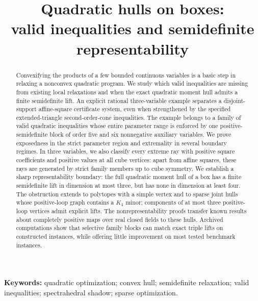 \documentclass[11pt]{article}
\title{Quadratic hulls on boxes:\\valid inequalities and semidefinite representability}
\author{}
\date{}
\begin{document}
\maketitle
\begin{abstract}
Convexifying the products of a few bounded continuous variables is a basic
step in relaxing a nonconvex quadratic program. We study which valid
inequalities are missing from existing local relaxations and when the exact
quadratic moment hull admits a finite semidefinite lift. An explicit rational
three-variable example separates a disjoint-support affine-square
certificate system, even when strengthened by the specified extended-triangle
second-order-cone inequalities. The example belongs to a family of valid
quadratic inequalities whose entire parameter range is enforced by one
positive-semidefinite block of order five and six nonnegative auxiliary
variables. We prove exposedness in the strict parameter region and extremality
in several boundary regimes. In three variables, we also classify every extreme
ray with positive square coefficients and positive values at all cube vertices:
apart from affine squares, these rays are generated by strict family members
up to cube symmetry. We establish a sharp
representability boundary: the full quadratic moment hull of a box has a
finite semidefinite lift in dimension at most three, but has none in dimension
at least four. The obstruction extends to polytopes with a simple vertex and
to sparse joint hulls whose positive-loop graph contains a $K_4$ minor;
components of at most three positive-loop vertices admit explicit lifts.
The nonrepresentability proofs transfer known results about completely
positive maps over real closed fields to these hulls. Archived computations
show that selective family blocks can match exact triple lifts on constructed
instances, while offering little improvement on most tested benchmark
instances.
\end{abstract}
\noindent\textbf{Keywords:} quadratic optimization; convex hull; semidefinite
relaxation; valid inequalities; spectrahedral shadow; sparse optimization.














\appendix






\end{document}
